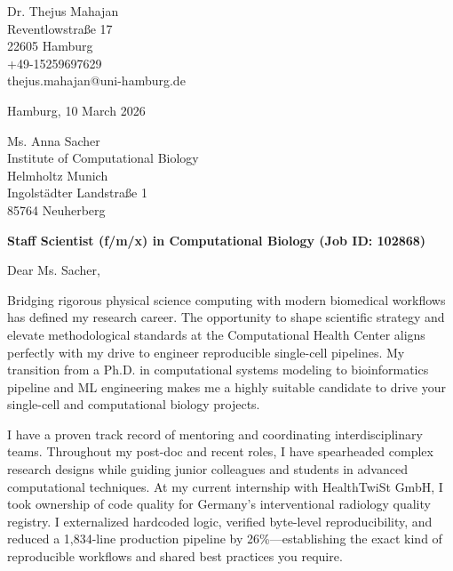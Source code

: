 \documentclass[9pt, a4paper]{extarticle}
\begin{document}
\pagestyle{empty}

\begin{flushleft}
Dr. Thejus Mahajan\\
Reventlowstra{\ss}e 17\\
22605 Hamburg\\
+49-15259697629\\
thejus.mahajan@uni-hamburg.de
\end{flushleft}

\vspace{0.3cm}

\begin{flushright}
Hamburg, 10 March 2026
\end{flushright}

\vspace{0.3cm}

\begin{flushleft}
Ms. Anna Sacher\\
Institute of Computational Biology\\
Helmholtz Munich\\
Ingolst\"adter Landstra{\ss}e 1\\
85764 Neuherberg
\end{flushleft}

\vspace{0.3cm}

\textbf{Staff Scientist (f/m/x) in Computational Biology (Job ID: 102868)}

\vspace{0.2cm}

Dear Ms. Sacher,

Bridging rigorous physical science computing with modern biomedical workflows has defined my research career. The opportunity to shape scientific strategy and elevate methodological standards at the Computational Health Center aligns perfectly with my drive to engineer reproducible single-cell pipelines. My transition from a Ph.D. in computational systems modeling to bioinformatics pipeline and ML engineering makes me a highly suitable candidate to drive your single-cell and computational biology projects.

I have a proven track record of mentoring and coordinating interdisciplinary teams. Throughout my post-doc and recent roles, I have spearheaded complex research designs while guiding junior colleagues and students in advanced computational techniques. At my current internship with HealthTwiSt GmbH, I took ownership of code quality for Germany's interventional radiology quality registry. I externalized hardcoded logic, verified byte-level reproducibility, and reduced a 1,834-line production pipeline by 26\%—establishing the exact kind of reproducible workflows and shared best practices you require.
\end{document}
